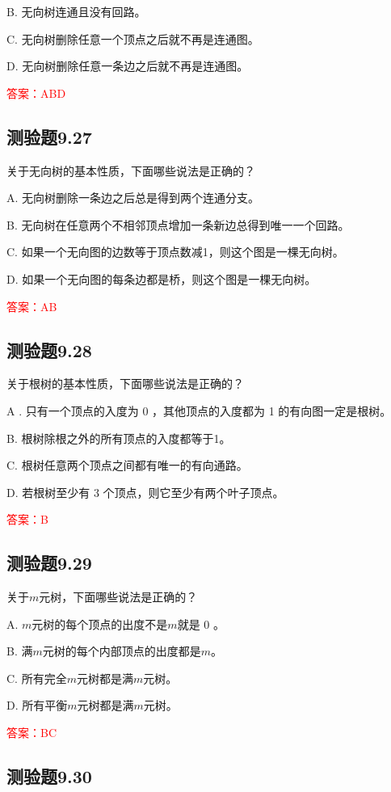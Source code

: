 \documentclass[UTF8, heading=true]{ctexart}
\begin{document}
B. 无向树连通且没有回路。

C. 无向树删除任意一个顶点之后就不再是连通图。

D. 无向树删除任意一条边之后就不再是连通图。


\textcolor{red}{答案：ABD}

\subsection{测验题9.27}

关于无向树的基本性质，下面哪些说法是正确的？

A. 无向树删除一条边之后总是得到两个连通分支。

B. 无向树在任意两个不相邻顶点增加一条新边总得到唯一一个回路。

C. 如果一个无向图的边数等于顶点数减1，则这个图是一棵无向树。

D. 如果一个无向图的每条边都是桥，则这个图是一棵无向树。

\textcolor{red}{答案：AB}

\subsection{测验题9.28}

关于根树的基本性质，下面哪些说法是正确的？

A . 只有一个顶点的入度为 0 ，其他顶点的入度都为 1 的有向图一定是根树。

B. 根树除根之外的所有顶点的入度都等于1。

C. 根树任意两个顶点之间都有唯一的有向通路。

D. 若根树至少有 3 个顶点，则它至少有两个叶子顶点。

\textcolor{red}{答案：B}

\subsection{测验题9.29}

关于$m$元树，下面哪些说法是正确的？

A. $m$元树的每个顶点的出度不是$m$就是 0 。

B. 满$m$元树的每个内部顶点的出度都是$m$。

C. 所有完全$m$元树都是满$m$元树。

D. 所有平衡$m$元树都是满$m$元树。


\textcolor{red}{答案：BC}

\subsection{测验题9.30}
\end{document}

